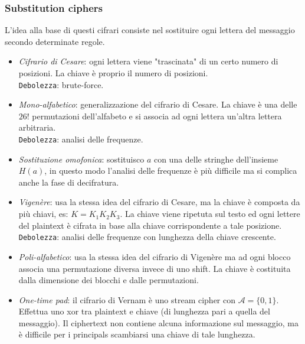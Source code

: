 \documentclass[a4paper, 11pt, notitlepage, fleqn]{report}
\begin{document}
\subsubsection{Substitution ciphers}
L'idea alla base di questi cifrari consiste nel sostituire ogni lettera del messaggio secondo determinate regole.
\begin{itemize}
	\item \emph{Cifrario di Cesare}: ogni lettera viene "trascinata" di un certo numero di posizioni. La chiave è proprio il numero di posizioni.\\
	\texttt{Debolezza}: brute-force.
	\item \emph{Mono-alfabetico}: generalizzazione del cifrario di Cesare. La chiave è una delle $26!$ permutazioni dell'alfabeto e si associa ad ogni lettera un'altra lettera arbitraria.\\
	\texttt{Debolezza}: analisi delle frequenze.
	\item \emph{Sostituzione omofonica}: sostituisco $a$ con una delle stringhe dell'insieme $H(a)$, in questo modo l'analisi delle frequenze è più difficile ma si complica anche la fase di decifratura.
	\item \emph{Vigenère}: usa la stessa idea del cifrario di Cesare, ma la chiave è composta da più chiavi, es: $K = K_1K_2K_3$. La chiave viene ripetuta sul testo ed ogni lettere del plaintext è cifrata in base alla chiave corrispondente a tale posizione.\\
	\texttt{Debolezza}: analisi delle frequenze con lunghezza della chiave crescente.
	\item \emph{Poli-alfabetico}: usa la stessa idea del cifrario di Vigenère ma ad ogni blocco associa una permutazione diversa invece di uno shift. La chiave è costituita dalla dimensione dei blocchi e dalle permutazioni.
	\item \emph{One-time pad}: il cifrario di Vernam è uno stream cipher con $\mathcal{A}=\{0,1\}$. Effettua uno xor tra plaintext e chiave (di lunghezza pari a quella del messaggio). Il ciphertext non contiene alcuna informazione sul messaggio, ma è difficile per i principals scambiarsi una chiave di tale lunghezza.
\end{itemize}
\end{document}
